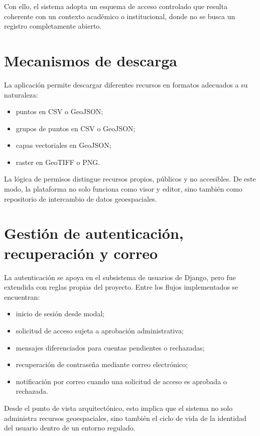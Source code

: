 \documentclass[12pt,a4paper]{report}
\begin{document}
Con ello, el sistema adopta un esquema de acceso controlado que resulta coherente con un contexto acad\'emico o institucional, donde no se busca un registro completamente abierto.

\section{Mecanismos de descarga}

La aplicaci\'on permite descargar diferentes recursos en formatos adecuados a su naturaleza:

\begin{itemize}
    \item puntos en CSV o GeoJSON;
    \item grupos de puntos en CSV o GeoJSON;
    \item capas vectoriales en GeoJSON;
    \item raster en GeoTIFF o PNG.
\end{itemize}

La l\'ogica de permisos distingue recursos propios, p\'ublicos y no accesibles. De este modo, la plataforma no solo funciona como visor y editor, sino tambi\'en como repositorio de intercambio de datos geoespaciales.

\section{Gesti\'on de autenticaci\'on, recuperaci\'on y correo}

La autenticaci\'on se apoya en el subsistema de usuarios de Django, pero fue extendida con reglas propias del proyecto. Entre los flujos implementados se encuentran:

\begin{itemize}
    \item inicio de sesi\'on desde modal;
    \item solicitud de acceso sujeta a aprobaci\'on administrativa;
    \item mensajes diferenciados para cuentas pendientes o rechazadas;
    \item recuperaci\'on de contrase\~na mediante correo electr\'onico;
    \item notificaci\'on por correo cuando una solicitud de acceso es aprobada o rechazada.
\end{itemize}

Desde el punto de vista arquitect\'onico, esto implica que el sistema no solo administra recursos geoespaciales, sino tambi\'en el ciclo de vida de la identidad del usuario dentro de un entorno regulado.
\end{document}
